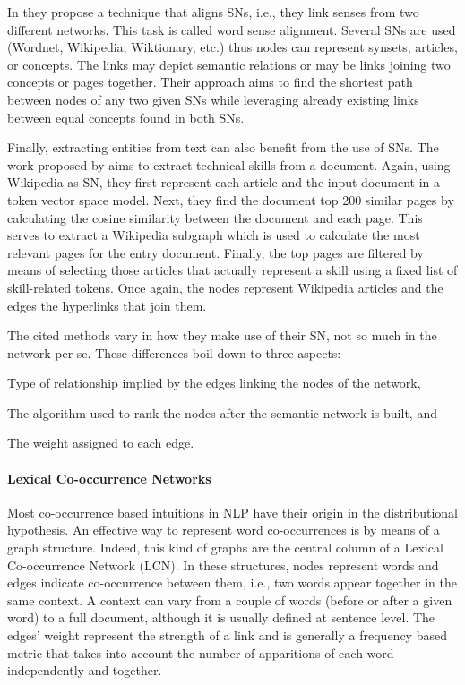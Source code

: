 In \cite{2013.Matuschek.Gurevych.Dijsktra.WSA} they propose a technique that aligns SNs, i.e., they link senses from two different networks. This task is called word sense alignment. Several SNs are used (Wordnet, Wikipedia, Wiktionary, etc.) thus nodes can represent synsets, articles, or concepts. The links may depict semantic relations or may be links joining two concepts or pages together. Their approach aims to find the shortest path between nodes of any two given SNs while leveraging already existing links between  equal concepts found in both SNs.



Finally, extracting entities from text can also benefit from the use of SNs. The work proposed by  \cite{2013.Kivimaki.AGraph-BasedApproach} aims to extract technical skills from a document. Again, using Wikipedia as SN, they first represent each article and the input document in a token vector space model.  Next, they find the document top 200 similar pages by calculating the cosine similarity between the document and each page. This serves to extract a Wikipedia subgraph which is used to calculate the most relevant pages for the entry document. Finally, the top pages are filtered by means of selecting those articles that actually represent a skill using a fixed list of skill-related tokens. Once again, the nodes represent Wikipedia articles and the edges the hyperlinks that join them.


The cited methods vary in how they make use of their SN, not so much in the network per se. These differences boil down to three aspects:
\begin{bulletList}
\item Type of relationship implied by the edges linking the nodes of the network, 
\item The algorithm used to rank the nodes after the semantic network is built, and
\item The weight assigned to each edge.
\end{bulletList}


\paragraph{Lexical Co-occurrence Networks}
Most co-occurrence based intuitions in NLP have their origin in the distributional hypothesis. An effective way to  represent word co-occurrences is by means of a graph structure. Indeed, this kind of graphs are the central column of a Lexical Co-occurrence Network (LCN). In these structures, nodes represent words and edges indicate co-occurrence between them, i.e., two words appear together in the same context. A context can vary from a couple of words (before or after a given word) to a full document, although it is usually defined at sentence level. The edges' weight  represent the strength of a link and is generally a frequency based metric that takes into account the  number of apparitions of each word independently and together.

